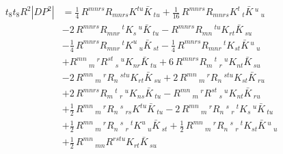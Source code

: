 \begin{equation}
\begin{aligned}
t_8 t_8 R^2 |DP^2|
&=\frac{1}{4}\,R^{m n r s} R_{m n r s} K^{t u} \bar{K}\,_{t u}
+\frac{1}{16}\,R^{m n r s} R_{m n r s} K^{t}\,_{t} \bar{K}\,^{u}\,_{u}\\
&-2\,R^{m n r s} R_{m n r}\,^{t} K_{s}\,^{u} \bar{K}\,_{t u}
-R^{m n r s} R_{m n}\,^{t u} K_{r t} \bar{K}\,_{s u}\\
&-\frac{1}{4}\,R^{m n r s} R_{m n r}\,^{t} K^{u}\,_{u} \bar{K}\,_{s t}
-\frac{1}{4}\,R^{m n r s} R_{m n r}\,^{t} K_{s t} \bar{K}\,^{u}\,_{u}\\
&+R^{m n}\,_{m}\,^{r} R^{s t}\,_{s}\,^{u} K_{n r} \bar{K}\,_{t u}
+6\,R^{m n r s} R_{m}\,^{t}\,_{r}\,^{u} K_{n t} \bar{K}\,_{s u}\\
&-2\,R^{m n}\,_{m}\,^{r} R_{n}\,^{s t u} K_{r t} \bar{K}\,_{s u}
+2\,R^{m n}\,_{m}\,^{r} R_{n}\,^{s t u} K_{s t} \bar{K}\,_{r u}\\
&+2\,R^{m n r s} R_{m}\,^{t}\,_{r}\,^{u} K_{n s} \bar{K}\,_{t u}
-R^{m n}\,_{m}\,^{r} R^{s t}\,_{s}\,^{u} K_{n t} \bar{K}\,_{r u}\\
&+\frac{1}{2}\,R^{m n}\,_{m}\,^{r} R_{n}\,^{s}\,_{r s} K^{t u} \bar{K}\,_{t u}
-2\,R^{m n}\,_{m}\,^{r} R_{n}\,^{s}\,_{r}\,^{t} K_{s}\,^{u} \bar{K}\,_{t u}\\
&+\frac{1}{2}\,R^{m n}\,_{m}\,^{r} R_{n}\,^{s}\,_{r}\,^{t} K^{u}\,_{u} \bar{K}\,_{s t}
+\frac{1}{2}\,R^{m n}\,_{m}\,^{r} R_{n}\,^{s}\,_{r}\,^{t} K_{s t} \bar{K}\,^{u}\,_{u}\\
&+\frac{1}{2}\,R^{m n}\,_{m n} R^{r s t u} K_{r t} \bar{K}\,_{s u}
\end{aligned}
\end{equation}

